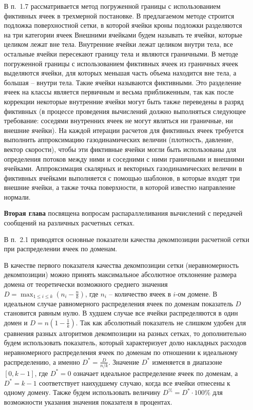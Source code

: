 \documentclass[a4paper,14pt]{extarticle}                     %
\theoremstyle{plain}                                         %
\begin{document}
В п.~1.7 рассматривается метод погруженной границы с использованием фиктивных ячеек в трехмерной постановке.
В предлагаемом методе строится подложка поверхностной сетки, в которой ячейки кроны подложки разделяются на три категории ячеек 
Внешними ячейками будем называть те ячейки, которые целиком лежат вне тела.
Внутренние ячейки лежат целиком внутри тела, все остальные ячейки пересекают границу тела и являются граничными.
В методе погруженной границы с использованием фиктивных ячеек из граничных ячеек выделяются ячейки, для которых меньшая часть объема находится вне тела, а большая -- внутри тела.
Такие ячейки называются фиктивными.
Это разделение ячеек на классы является первичным и весьма приближенным, так как после коррекции некоторые внутренние ячейки могут быть также переведены в разряд фиктивных (в процессе проведения вычислений должно выполняться следующее требование: соседями внутренних ячеек не могут являться ни граничные, ни внешние ячейки).
На каждой итерации расчетов для фиктивных ячеек требуется выполнить аппроксимацию газодинамических величин (плотность, давление, вектор скорости), чтобы эти фиктивные ячейки могли быть использованы для определения потоков между ними и соседними с ними граничными и внешними ячейками.
Аппроксимация скалярных и векторных газодинамических величин в фиктивных ячейками выполняется с помощью шаблонов, в которые входят три внешние ячейки, а также точка поверхности, в которой известно направление нормали.



\textbf{Вторая глава} посвящена вопросам распараллеливания вычислений с передачей сообщений на различных расчетных сетках.


В п.~2.1 приводятся основные показатели качества декомпозиции расчетной сетки при распределении ячеек по доменам.

В качестве первого показателя качества декомпозиции сетки (неравномерность декомпозиции) можно принять максимальное абсолютное отклонение размера домена от теоретически возможного среднего значения $D = \max_{1 \le i \le k}{ \left( n_i - \frac{n}{k} \right) }$, где $n_i$ – количество ячеек в $i$-ом домене.
В идеальном случае равномерного распределения ячеек по доменам показатель $D$ становится равным нулю.
В худшем случае все ячейки распределяются в один домен и $D = n \left( 1 - \frac{1}{k} \right)$.
Так как абсолютный показатель не слишком удобен для сравнения разных алгоритмов декомпозиции на разных сетках, то дополнительно будем использовать показатель, который характеризует долю накладных расходов неравномерного распределения ячеек по доменам по отношении к идеальному распределению, а именно $D^{*} = \frac{D}{n / k}$.
Значение $D^{*}$ изменяется в диапазоне $[0, k - 1]$, где $D^{*} = 0$ означает идеальное распределение ячеек по доменам, а $D^{*} = k - 1$ соответствует наихудшему случаю, когда все ячейки отнесены к одному домену.
Также будем использовать величину $D^{\%} = D^{*} \cdot 100\%$ для возможности указания значения показателя в процентах.
\end{document}
